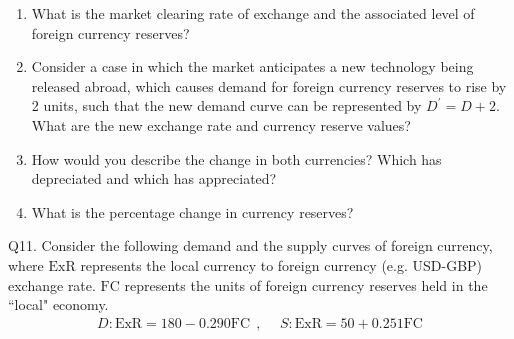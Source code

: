 \documentclass[12pt]{article}
\begin{document}
\begin{enumerate}[1)]

\item What is the market clearing rate of exchange and the associated level of foreign currency reserves?

\vspace{0.8in}

\item Consider a case in which the market anticipates a new technology being released abroad, which causes demand for foreign currency reserves to rise by 2 units, such that the new demand curve can be represented by $D^{'} = D + 2$.
What are the new exchange rate and currency reserve values?

\vspace{0.8in}

\item How would you describe the change in both currencies? Which has depreciated and which has appreciated?

\vspace{0.8in}

\item What is the percentage change in currency reserves?

\vspace{0.8in}

\end{enumerate}

\newpage

\noindent Q11. Consider the following demand and the supply curves of foreign currency, where $\text{ExR}$ represents the local currency to foreign currency (e.g. USD-GBP) exchange rate.
$\text{FC}$ represents the units of foreign currency reserves held in the ``local" economy. 
\begin{align*}
D: \text{ExR} =  180 - 0.290 \text{FC} \ \ , & \ \ S: \text{ExR} =  50 + 0.251 \text{FC}
\end{align*}
\end{document}
